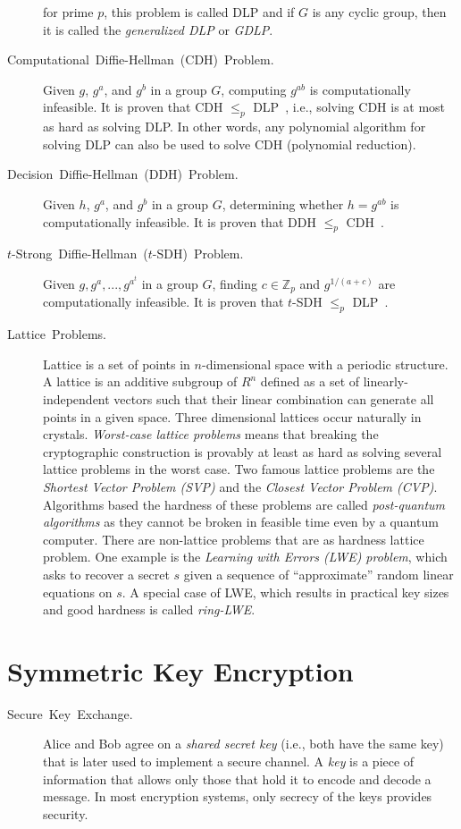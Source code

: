 \documentclass[11pt]{article}
\theoremstyle{plain}
\begin{document}
\begin{description}
	for prime $p$, this problem is called DLP and if $G$ is any cyclic
	group, then it is called the \emph{generalized DLP} or \emph{GDLP}.
	\item [{Computational~Diffie-Hellman~(CDH)~Problem.}] Given $g$, $g^{a}$,
	and $g^{b}$ in a group $G$, computing $g^{ab}$ is computationally
	infeasible. It is proven that CDH $\leq_{p}$ DLP~\cite{vercautern:ecrypt:2013},
	i.e., solving CDH is at most as hard as solving DLP. In other words,
	any polynomial algorithm for solving DLP can also be used to solve
	CDH (polynomial reduction).
	\item [{Decision~Diffie-Hellman~(DDH)~Problem.}] Given $h$, $g^{a}$,
	and $g^{b}$ in a group $G$, determining whether $h=g^{ab}$ is computationally
	infeasible. It is proven that DDH $\leq_{p}$ CDH~\cite{vercautern:ecrypt:2013}.
	\item [{$t$-Strong~Diffie-Hellman~($t$-SDH)~Problem.}] Given $g,g^{a},...,g^{a^{t}}$
	in a group $G$, finding $c\in\mathbb{Z}_{p}$ and $g^{1/(a+c)}$
	are computationally infeasible. It is proven that $t$-SDH $\leq_{p}$
	DLP~\cite{vercautern:ecrypt:2013}.
	\item [{Lattice~Problems.}] Lattice is a set of points in $n$-dimensional
	space with a periodic structure. A lattice is an additive subgroup
	of $R^{n}$ defined as a set of linearly-independent vectors such
	that their linear combination can generate all points in a given space.
	Three dimensional lattices occur naturally in crystals. \emph{Worst-case
		lattice problems} means that breaking the cryptographic construction
	is provably at least as hard as solving several lattice problems in
	the worst case. Two famous lattice problems are the \emph{Shortest
		Vector Problem (SVP)} and the \emph{Closest Vector Problem (CVP)}.
	Algorithms based the hardness of these problems are called \emph{post-quantum
		algorithms} as they cannot be broken in feasible time even by a quantum
	computer. There are non-lattice problems that are as hardness lattice
	problem. One example is the \emph{Learning with Errors (LWE) problem},
	which asks to recover a secret $s$ given a sequence of ``approximate''
	random linear equations on $s$. A special case of LWE, which results
	in practical key sizes and good hardness is called \emph{ring-LWE}.
\end{description}

\section{Symmetric Key Encryption}
\begin{description}
	\item [{Secure~Key~Exchange.}] Alice and Bob agree on a \emph{shared
		secret key} (i.e., both have the same key) that is later used to implement
	a secure channel. A \emph{key} is a piece of information that allows
	only those that hold it to encode and decode a message. In most encryption
	systems, only secrecy of the keys provides security. 
\end{description}
\end{document}
